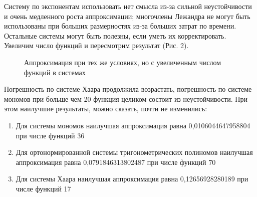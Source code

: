 ﻿\documentclass[a4paper, 12pt]{article}
\begin{document}
Систему по экспонентам использовать нет смысла из-за сильной неустойчивости и очень медленного роста аппроксимации; многочлены Лежандра не могут быть использованы при больших размерностях из-за больших затрат по времени. Остальные системы могут быть полезны, если уметь их корректировать. Увеличим число функций и пересмотрим результат (Рис. 2).

\begin{figure}[h!]
    \noindent{}
    \caption{Аппроксимация при тех же условиях, но с увеличенным числом функций в системах}
    \label{figCurves}
\end{figure}

Погрешность по системе Хаара продолжила возрастать, погрешность по системе мономов при больше чем 20 функция целиком состоит из неустойчивости. При этом наилучшие результаты, можно сказать, почти не изменились:

\begin{enumerate}
\item  Для системы мономов наилучшая аппроксимация равна 0,0106044647958804 при числе функций 36

\item  Для ортонормированной системы тригонометрических полиномов наилучшая аппроксимация равна 0,0791846313802487 при числе функций 70

\item  Для системы Хаара наилучшая аппроксимация равна 0,12656928280189 при числе функций 17
\end{enumerate}
\end{document}
